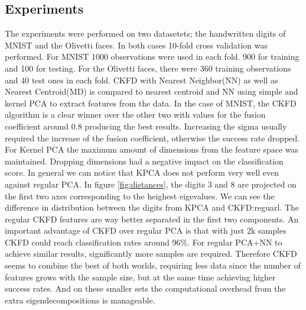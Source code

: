 \documentclass[7 pt]{article}
\begin{document}
\begin{multicols}{2}
\section{Experiments}
 
The experiments were performed on two datasetets; the handwritten digits of MNIST and the Olivetti faces.  In both cases 10-fold cross validation was performed. For MNIST 1000 observations were used in each fold. 900 for training and 100 for testing. For the Olivetti faces, there were 360 training observations and 40 test ones in each fold.  CKFD with Nearest Neighbor(NN) as well as Nearest Centroid(MD) is compared to  nearest centroid and NN using simple and kernel PCA to extract features from the data. In the case of MNIST, the CKFD algorithm is a clear winner over the other two with values for the fusion coefficient around 0.8 producing the best results. Increasing the sigma usually required the increase of the fusion coefficient, otherwise the success rate dropped.
For Kernel PCA the maximum amount of dimensions from the feature space was maintained. Dropping dimensions  had a negative impact on the classification score. In general we can notice that KPCA does not perform very well even against regular PCA. In figure \ref{fig:distances}, the digits 3 and 8 are projected on the first two axes corresponding to the heighest eigevalues. We can see the difference in distribution between the digits from KPCA and CKFD:reguarl. The regular CKFD features are way better separated in the first two components. An important advantage of CKFD over regular PCA is that with just 2k samples CKFD could reach classification rates around 96$\%$. For regular PCA+NN to achieve similar results, significantly more samples are required. Therefore CKFD seems to combine the best of both worlds, requiring less data since the number of features grows with the sample size, but at the same time achieving higher success rates. And on these smaller sets the computational overhead from the extra eigendecompositions is manageable.

\end{multicols}
\end{document}
